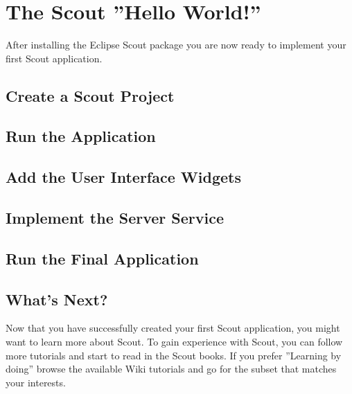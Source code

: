 \documentclass{article}
\begin{document}
\section*{The Scout ''Hello World!''}

After installing the Eclipse Scout package you are now ready to implement your first Scout application. 

\subsection*{Create a Scout Project}

\subsection*{Run the Application}

\subsection*{Add the User Interface Widgets}

\subsection*{Implement the Server Service}


\subsection*{Run the Final Application}


\subsection*{What's Next?}

Now that you have successfully created your first Scout application, you might want to learn more about Scout. 
To gain experience with Scout, you can follow more tutorials and start to read in the Scout books.
If you prefer ''Learning by doing'' browse the available Wiki tutorials and go for the subset that matches your interests.
\end{document}
